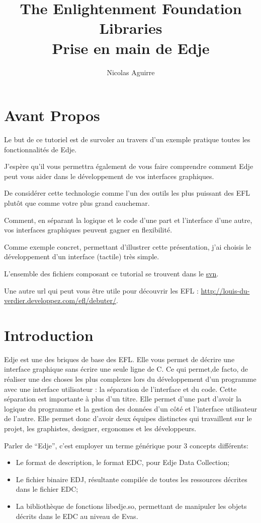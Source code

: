 \documentclass[a4paper]{efr}
\title{The Enlightenment Foundation Libraries\\
  \normalsize{Prise en main de Edje}}
\author{Nicolas Aguirre}
\begin{document}
\maketitle
\tableofcontents

\section{Avant Propos}

Le but de ce tutoriel est de survoler au travers d'un exemple pratique toutes
les fonctionnalités de Edje.

J'espère qu'il vous permettra également de vous faire comprendre comment Edje
peut vous aider dans le développement de vos interfaces graphiques.

De considérer cette technologie comme l'un des outils les plus puissant des
EFL plutôt que comme votre plus grand cauchemar.

Comment, en séparant la logique et le code d'une part et l'interface d'une
autre, vos interfaces graphiques peuvent gagner en flexibilité.

Comme exemple concret, permettant d'illustrer cette présentation, j'ai choisis
le développement d'un interface (tactile) très simple.

L'ensemble des fichiers composant ce tutorial se trouvent dans le
\href{http://trac.enlightenment.org/e/browser/trunk/DOCS/tutorials/fr/edje}{svn}.

Une autre url qui peut vous être utile pour découvrir les EFL :
\url{http://louis-du-verdier.developpez.com/efl/debuter/}.

\section{Introduction}

Edje est une des briques de base des EFL. Elle vous permet de décrire une
interface graphique sans écrire une seule ligne de C. Ce qui permet,de facto,
de réaliser une des choses les plus complexes lors du développement d'un
programme avec une interface utilisateur : la séparation de l'interface et du
code. Cette séparation est importante à plus d'un titre. Elle permet d'une part
d'avoir la logique du programme et la gestion des données d'un côté et
l'interface utilisateur de l'autre. Elle permet donc d'avoir deux équipes
distinctes qui travaillent sur le projet, les graphistes, designer, ergonomes et
les développeurs.

Parler de ``Edje'', c'est employer un terme générique pour 3 concepts
différents:
\begin{itemize}
\item Le format de description, le format EDC, pour Edje Data Collection;
\item Le fichier binaire EDJ, résultante compilée de toutes les ressources
décrites dans le fichier EDC;
\item La bibliothèque de fonctions libedje.so, permettant de manipuler les
objets décrits dans le EDC au niveau de Evas.
\end{itemize}
\end{document}
